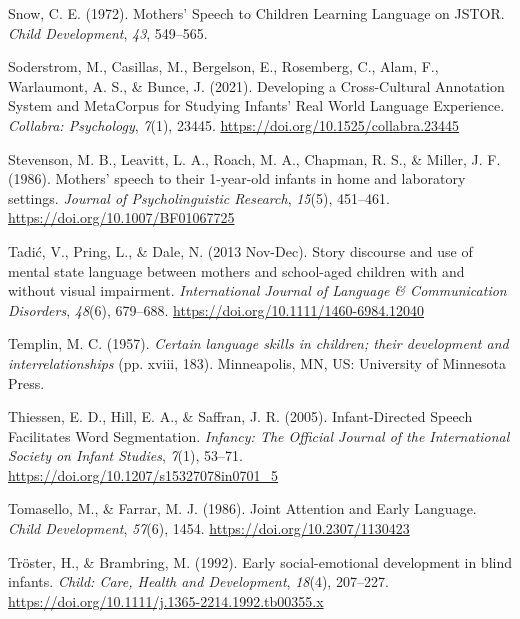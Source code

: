 \documentclass[
  man,floatsintext]{apa6}
\newlength{\cslhangindent}
\newlength{\cslentryspacingunit} %
\newenvironment{CSLReferences}[2] %
 {%
  \setlength{\parindent}{0pt}
  \ifodd #1
  \let\oldpar\par
  \def\par{\hangindent=\cslhangindent\oldpar}
  \fi
  \setlength{\parskip}{#2\cslentryspacingunit}
 }%
 {}
\begin{document}
\begin{CSLReferences}{1}{0}
\leavevmode{}%
Snow, C. E. (1972). Mothers' {Speech} to {Children Learning Language} on {JSTOR}. \emph{Child Development}, \emph{43}, 549--565.

\leavevmode{}%
Soderstrom, M., Casillas, M., Bergelson, E., Rosemberg, C., Alam, F., Warlaumont, A. S., \& Bunce, J. (2021). Developing a {Cross-Cultural Annotation System} and {MetaCorpus} for {Studying Infants}' {Real World Language Experience}. \emph{Collabra: Psychology}, \emph{7}(1), 23445. \url{https://doi.org/10.1525/collabra.23445}

\leavevmode{}%
Stevenson, M. B., Leavitt, L. A., Roach, M. A., Chapman, R. S., \& Miller, J. F. (1986). Mothers' speech to their 1-year-old infants in home and laboratory settings. \emph{Journal of Psycholinguistic Research}, \emph{15}(5), 451--461. \url{https://doi.org/10.1007/BF01067725}

\leavevmode{}%
Tadić, V., Pring, L., \& Dale, N. (2013 Nov-Dec). Story discourse and use of mental state language between mothers and school-aged children with and without visual impairment. \emph{International Journal of Language \& Communication Disorders}, \emph{48}(6), 679--688. \url{https://doi.org/10.1111/1460-6984.12040}

\leavevmode{}%
Templin, M. C. (1957). \emph{Certain language skills in children; their development and interrelationships} (pp. xviii, 183). {Minneapolis, MN, US}: {University of Minnesota Press}.

\leavevmode{}%
Thiessen, E. D., Hill, E. A., \& Saffran, J. R. (2005). Infant-{Directed Speech Facilitates Word Segmentation}. \emph{Infancy: The Official Journal of the International Society on Infant Studies}, \emph{7}(1), 53--71. \url{https://doi.org/10.1207/s15327078in0701_5}

\leavevmode{}%
Tomasello, M., \& Farrar, M. J. (1986). Joint {Attention} and {Early Language}. \emph{Child Development}, \emph{57}(6), 1454. \url{https://doi.org/10.2307/1130423}

\leavevmode{}%
Tröster, H., \& Brambring, M. (1992). Early social-emotional development in blind infants. \emph{Child: Care, Health and Development}, \emph{18}(4), 207--227. \url{https://doi.org/10.1111/j.1365-2214.1992.tb00355.x}


\end{CSLReferences}
\end{document}
